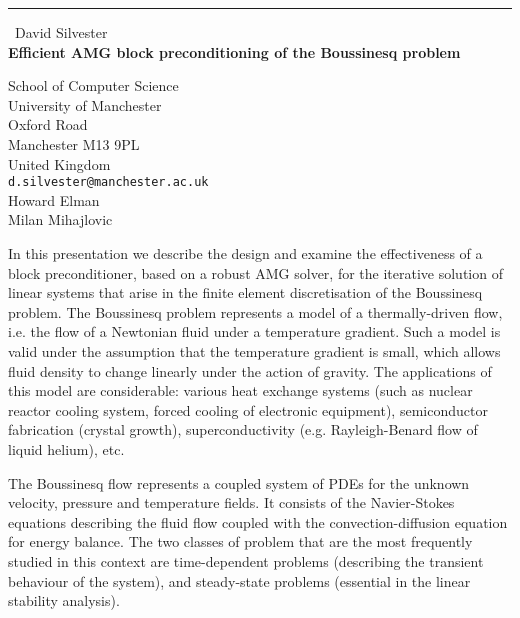 \documentclass{report}
\begin{document}
\begin{center}
\rule{6in}{1pt} \
{\large David Silvester \\
{\bf Efficient AMG block preconditioning of the Boussinesq problem}}

School of Computer Science \\ University of Manchester \\ Oxford Road \\ Manchester M13 9PL \\ United Kingdom
\\
{\tt  d.silvester@manchester.ac.uk}\\
Howard Elman\\
Milan Mihajlovic 
\end{center}

In this presentation we describe the design and examine the effectiveness
of a block preconditioner, based on a robust AMG solver, for the
iterative solution of linear systems that arise in the finite element
discretisation of the Boussinesq problem. The Boussinesq problem
represents a model of a thermally-driven flow, i.e. the flow of a
Newtonian fluid under a temperature
gradient. Such a model is valid under the assumption that the temperature
gradient is small, which allows fluid density to change linearly under
the action of gravity. The applications of this model are considerable:
various heat exchange systems (such as nuclear reactor cooling system,
forced cooling of
electronic equipment), semiconductor fabrication (crystal growth),
superconductivity (e.g. Rayleigh-Benard flow of liquid helium), etc.

The Boussinesq flow represents a coupled system of PDEs for the unknown
velocity, pressure and temperature fields. It consists of the
Navier-Stokes equations describing the fluid flow coupled with the
convection-diffusion equation for energy balance. The two classes of
problem that are the most frequently studied in this context are
time-dependent problems (describing the
transient behaviour of the system), and steady-state problems (essential
in the linear stability analysis).
\end{document}
